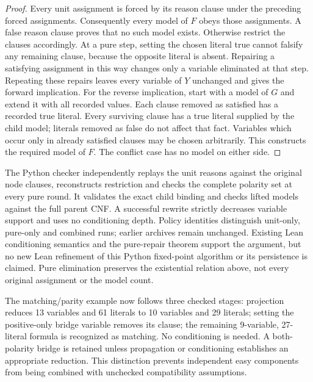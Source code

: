 \documentclass[11pt,a4paper]{article}
\numberwithin{equation}{section}
\theoremstyle{plain}
\theoremstyle{definition}
\theoremstyle{remark}
\begin{document}
\begin{proof}
Every unit assignment is forced by its reason clause under the preceding forced assignments. Consequently every model of $F$ obeys those assignments. A false reason clause proves that no such model exists. Otherwise restrict the clauses accordingly. At a pure step, setting the chosen literal true cannot falsify any remaining clause, because the opposite literal is absent. Repairing a satisfying assignment in this way changes only a variable eliminated at that step. Repeating these repairs leaves every variable of $Y$ unchanged and gives the forward implication. For the reverse implication, start with a model of $G$ and extend it with all recorded values. Each clause removed as satisfied has a recorded true literal. Every surviving clause has a true literal supplied by the child model; literals removed as false do not affect that fact. Variables which occur only in already satisfied clauses may be chosen arbitrarily. This constructs the required model of $F$. The conflict case has no model on either side.
\end{proof}

The Python checker independently replays the unit reasons against the original node clauses, reconstructs restriction and checks the complete polarity set at every pure round. It validates the exact child binding and checks lifted models against the full parent CNF. A successful rewrite strictly decreases variable support and uses no conditioning depth. Policy identities distinguish unit-only, pure-only and combined runs; earlier archives remain unchanged. Existing Lean conditioning semantics and the pure-repair theorem support the argument, but no new Lean refinement of this Python fixed-point algorithm or its persistence is claimed. Pure elimination preserves the existential relation above, not every original assignment or the model count.

The matching/parity example now follows three checked stages: projection reduces 13 variables and 61 literals to 10 variables and 29 literals; setting the positive-only bridge variable removes its clause; the remaining 9-variable, 27-literal formula is recognized as matching. No conditioning is needed. A both-polarity bridge is retained unless propagation or conditioning establishes an appropriate reduction. This distinction prevents independent easy components from being combined with unchecked compatibility assumptions.
\end{document}
